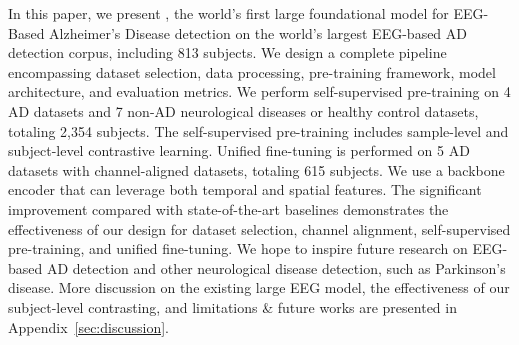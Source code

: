 


In this paper, we present \name, the world's first large foundational model for EEG-Based Alzheimer’s Disease detection on the world's largest EEG-based AD detection corpus, including 813 subjects. We design a complete pipeline encompassing dataset selection, data processing, pre-training framework, model architecture, and evaluation metrics. We perform self-supervised pre-training on 4 AD datasets and 7 non-AD neurological diseases or healthy control datasets, totaling 2,354 subjects. The self-supervised pre-training includes sample-level and subject-level contrastive learning. Unified fine-tuning is performed on 5 AD datasets with channel-aligned datasets, totaling 615 subjects. We use a backbone encoder that can leverage both temporal and spatial features. The significant improvement compared with state-of-the-art baselines demonstrates the effectiveness of our design for dataset selection, channel alignment, self-supervised pre-training, and unified fine-tuning. We hope to inspire future research on EEG-based AD detection and other neurological disease detection, such as Parkinson's disease. More discussion on the existing large EEG model, the effectiveness of our subject-level contrasting, and limitations \& future works are presented in Appendix~\ref{sec:discussion}.